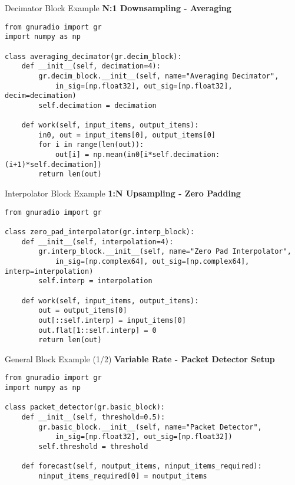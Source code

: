 \documentclass[aspectratio=169,11pt]{beamer}
\begin{document}
\begin{frame}[fragile]{Decimator Block Example}
\textbf{N:1 Downsampling - Averaging}
\tiny
\begin{verbatim}
from gnuradio import gr
import numpy as np

class averaging_decimator(gr.decim_block):
    def __init__(self, decimation=4):
        gr.decim_block.__init__(self, name="Averaging Decimator",
            in_sig=[np.float32], out_sig=[np.float32], decim=decimation)
        self.decimation = decimation
    
    def work(self, input_items, output_items):
        in0, out = input_items[0], output_items[0]
        for i in range(len(out)):
            out[i] = np.mean(in0[i*self.decimation:(i+1)*self.decimation])
        return len(out)
\end{verbatim}
\end{frame}

\begin{frame}[fragile]{Interpolator Block Example}
\textbf{1:N Upsampling - Zero Padding}
\tiny
\begin{verbatim}
from gnuradio import gr

class zero_pad_interpolator(gr.interp_block):
    def __init__(self, interpolation=4):
        gr.interp_block.__init__(self, name="Zero Pad Interpolator",
            in_sig=[np.complex64], out_sig=[np.complex64], interp=interpolation)
        self.interp = interpolation
    
    def work(self, input_items, output_items):
        out = output_items[0]
        out[::self.interp] = input_items[0]
        out.flat[1::self.interp] = 0
        return len(out)
\end{verbatim}
\end{frame}

\begin{frame}[fragile]{General Block Example (1/2)}
\textbf{Variable Rate - Packet Detector Setup}
\tiny
\begin{verbatim}
from gnuradio import gr
import numpy as np

class packet_detector(gr.basic_block):
    def __init__(self, threshold=0.5):
        gr.basic_block.__init__(self, name="Packet Detector",
            in_sig=[np.float32], out_sig=[np.float32])
        self.threshold = threshold
    
    def forecast(self, noutput_items, ninput_items_required):
        ninput_items_required[0] = noutput_items
\end{verbatim}
\end{frame}
\end{document}
